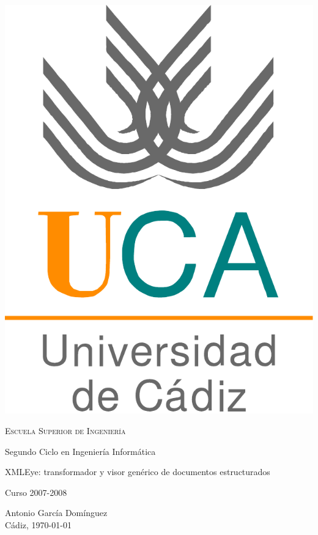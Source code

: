 \documentclass[a4paper,12pt,titlepage,halfparskip,cleardoubleempty]{scrbook}
\begin{document}


\begin{titlepage}
  \centering
  \includegraphics[width=.3\textwidth]{logo_uca}

  \bigskip
  \bigskip
  \bigskip
  
  \begin{changemargin}{3em}{3em}
    \centering

    {\Huge \textsc{\nohyphens{Escuela Superior de Ingeniería}}}
    
    \bigskip
    \bigskip
    \bigskip

    {\huge \nohyphens{Segundo Ciclo en Ingeniería Informática}}

    \bigskip
    \bigskip
    \bigskip
    \bigskip
    \bigskip
    \bigskip

    {\LARGE \nohyphens{XMLEye: transformador y visor genérico de documentos estructurados}}

    \bigskip
    \bigskip
    \bigskip
    \bigskip

    {\large Curso 2007-2008}

    \bigskip
    \bigskip
    \bigskip
    \bigskip
    \bigskip
    \bigskip
    \bigskip
      
    \end{changemargin}

    {\Large Antonio García Domínguez \\}
    {\large Cádiz, \today}

\end{titlepage}
\end{document}
